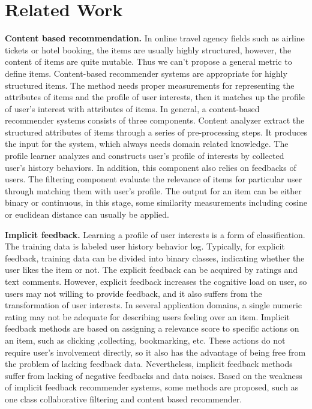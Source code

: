 \documentclass{sig-alternate-05-2015}
\begin{document}
\section{Related Work}
\textbf{Content based recommendation.} In online travel agency fields such as airline tickets or hotel booking, the items are usually highly structured, however, the content of items are quite mutable. Thus we can't propose a general metric to define items. Content-based recommender systems \cite{tech:cset}\cite{lops:handbook}are appropriate for highly structured items. The method needs proper measurements for representing the attributes of items and the profile of user interests, then it matches up the profile of user's interest with attributes of items. In general, a content-based recommender systems consists of three components. Content analyzer extract the structured attributes of items through a series of pre-processing steps. It produces the input for the system, which always needs domain related knowledge. The profile learner analyzes and constructs user's profile of interests by collected user's history behaviors. In addition, this component also relies on feedbacks of users. The filtering component evaluate the relevance of items for particular user through matching them with user's profile. The output for an item can be either binary or continuous, in this stage, some similarity measurements including cosine or euclidean distance can usually be applied.\par
\textbf{Implicit feedback.} Learning a profile of user interests is a form of classification. The training data is labeled user history behavior log. Typically, for explicit feedback, training data can be divided into binary classes, indicating whether the user likes the item or not. The explicit feedback can be acquired by ratings and text comments. However, explicit feedback increases the cognitive load on user, so users may not willing to provide feedback, and it also suffers from the transformation of user interests. In several application domains, a single numeric rating may not be adequate for describing users feeling over an item. Implicit feedback methods\cite{song:mining} are based on assigning a relevance score to specific actions on an item, such as clicking ,collecting, bookmarking, etc. These actions do not require user's involvement directly, so it also has the advantage of being free from the problem of lacking feedback data. Nevertheless, implicit feedback methods suffer from lacking of negative feedbacks and data noises. Based on the weakness of implicit feedback recommender systems, some methods are proposed, such as one class collaborative filtering and content based recommender.\par
\end{document}
